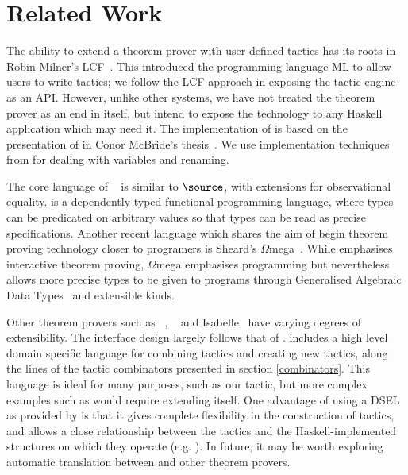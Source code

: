 \section{Related Work}

The ability to extend a theorem prover with user defined tactics has
its roots in Robin Milner's LCF~\cite{lcf-milner}. This introduced the
programming language ML to allow users to write tactics; we follow the
LCF approach in exposing the tactic engine as an API. However, unlike
other systems, we have not treated the theorem prover as an end in
itself, but intend to expose the technology to any Haskell application
which may need it.  The implementation of \Ivor{} is based on the
presentation of \Oleg{} in Conor McBride's
thesis~\cite{mcbride-thesis}. We use implementation
techniques from \cite{not-a-number} for dealing with variables and
renaming.

The core language of \Epigram{}~\cite{view-left,epireloaded} is
similar to $\source$, with extensions for observational
equality. \Epigram{} is a dependently typed functional programming
language, where types can be predicated on arbitrary values so that
types can be read as precise specifications.
Another recent language which shares the aim of begin theorem proving
technology closer to programers is Sheard's
$\Omega$mega~\cite{sheard-langfuture}. While \Ivor{} emphasises
interactive theorem proving, $\Omega$mega emphasises programming but
nevertheless allows more precise types to be given to programs through
Generalised Algebraic Data Types~\cite{gadts} and extensible
kinds. 

Other theorem provers such as \Coq{}~\cite{coq-manual},
\Agda{}~\cite{agda} and Isabelle~\cite{isabelle} have varying degrees
of extensibility. The interface design largely follows that of
\Coq{}. \Coq{} includes a high level domain specific language for
combining tactics and creating new tactics, along the lines of the
tactic combinators presented in section \ref{combinators}. This
language is ideal for many purposes, such as our 
tactic, but more complex examples such as  would
require extending \Coq{} itself. One advantage of using a
DSEL~\cite{hudak-edsl} as provided by \Ivor{} is that it gives complete
flexibility in the construction of tactics, and allows a close
relationship between the tactics and the Haskell-implemented
structures on which they operate (e.g. ). In future, it may
be worth exploring automatic translation between \Ivor{} and other
theorem provers.


